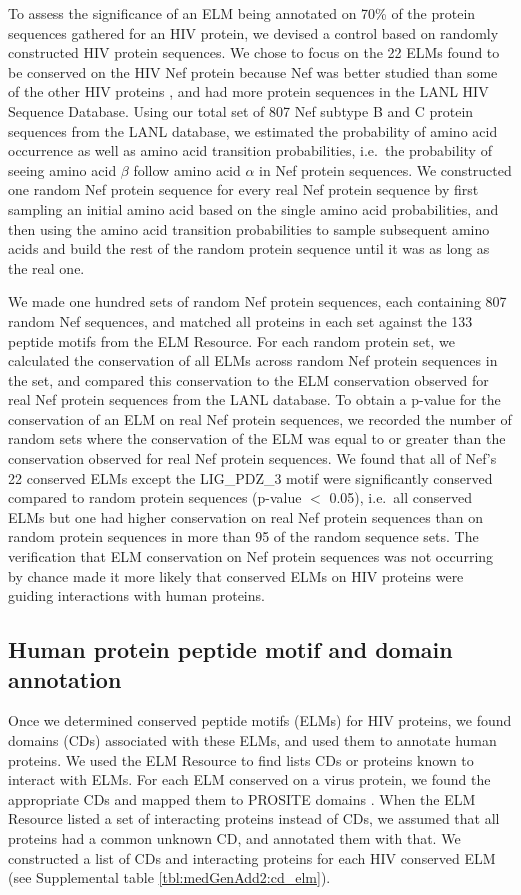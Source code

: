 To assess the significance of an ELM being annotated on 70\% of the
protein sequences gathered for an HIV protein, we devised a control
based on randomly constructed HIV protein sequences. We chose to focus
on the 22 ELMs found to be conserved on the HIV Nef protein because
Nef was better studied than some of the other HIV proteins
\cite{coleman06}, and had more protein sequences in the LANL HIV
Sequence Database. Using our total set of 807 Nef subtype B and C
protein sequences from the LANL database, we estimated the probability
of amino acid occurrence as well as amino acid transition
probabilities, i.e.\ the probability of seeing amino acid $\beta$
follow amino acid $\alpha$ in Nef protein sequences. We constructed
one random Nef protein sequence for every real Nef protein sequence by
first sampling an initial amino acid based on the single amino acid
probabilities, and then using the amino acid transition probabilities
to sample subsequent amino acids and build the rest of the random
protein sequence until it was as long as the real one.

We made one hundred sets of random Nef protein sequences, each
containing 807 random Nef sequences, and matched all proteins in each
set against the 133 peptide motifs from the ELM Resource. For each
random protein set, we calculated the conservation of all ELMs across
random Nef protein sequences in the set, and compared this
conservation to the ELM conservation observed for real Nef protein
sequences from the LANL database. To obtain a p-value for the
conservation of an ELM on real Nef protein sequences, we recorded the
number of random sets where the conservation of the ELM was equal to
or greater than the conservation observed for real Nef protein
sequences. We found that all of Nef's 22 conserved ELMs except the
LIG\_PDZ\_3 motif were significantly conserved compared to random
protein sequences (p-value $<$ 0.05), i.e.\ all conserved ELMs but one
had higher conservation on real Nef protein sequences than on random
protein sequences in more than 95 of the random sequence sets. The
verification that ELM conservation on Nef protein sequences was not
occurring by chance made it more likely that conserved ELMs on HIV
proteins were guiding interactions with human proteins.

\subsection{Human protein peptide motif and domain annotation}

Once we determined conserved peptide motifs (ELMs) for HIV proteins,
we found domains (CDs) associated with these ELMs, and used them to
annotate human proteins. We used the ELM Resource to find lists CDs or
proteins known to interact with ELMs. For each ELM conserved on a
virus protein, we found the appropriate CDs and mapped them to PROSITE
domains \cite{hulo08}. When the ELM Resource listed a set of
interacting proteins instead of CDs, we assumed that all proteins had
a common unknown CD, and annotated them with that. We constructed a
list of CDs and interacting proteins for each HIV conserved ELM (see
Supplemental table \ref{tbl:medGenAdd2:cd_elm}).


